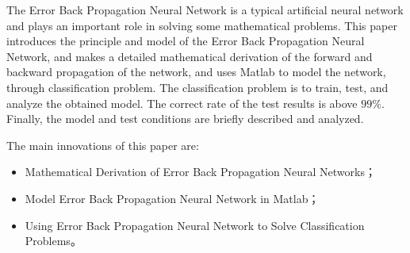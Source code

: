
\begin{eabstract}
  The Error Back Propagation Neural Network is a typical artificial neural network and plays an important role in solving some mathematical problems. This paper introduces the principle and model of the Error Back Propagation Neural Network, and makes a detailed mathematical derivation of the forward and backward propagation of the network, and uses Matlab to model the network, through classification problem. The classification problem is to train, test, and analyze the obtained model. The correct rate of the test results is above $99\%$. Finally, the model and test conditions are briefly described and analyzed.
  
  The main innovations of this paper are:
    \begin{itemize}
  	\item Mathematical Derivation of Error Back Propagation Neural Networks；
  	\item Model Error Back Propagation Neural Network in Matlab；
  	\item Using Error Back Propagation Neural Network to Solve Classification Problems。
  \end{itemize}
\end{eabstract}

